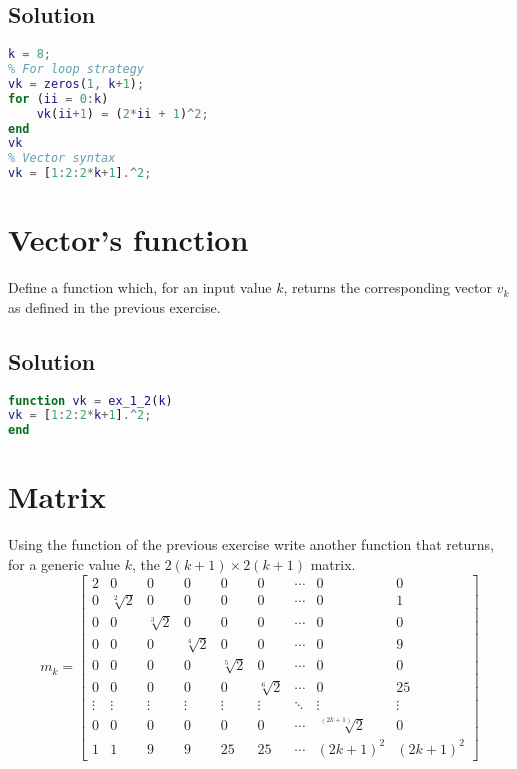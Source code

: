 \documentclass[12pt, a4paper]{report}
\begin{document}
    \subsection*{Solution}
        \begin{lstlisting}[language=Matlab]
k = 8;
% For loop strategy
vk = zeros(1, k+1);
for (ii = 0:k)
    vk(ii+1) = (2*ii + 1)^2;
end
vk
% Vector syntax
vk = [1:2:2*k+1].^2;            
        \end{lstlisting}  

    \newpage

    \section{Vector's function}
        Define a function which, for an input value $k$, returns the corresponding vector $v_k$ as defined in the previous exercise.
    \subsection*{Solution}
        \begin{lstlisting}[language=Matlab]
function vk = ex_1_2(k)
vk = [1:2:2*k+1].^2;
end
        \end{lstlisting}

    \newpage

    \section{Matrix}
        Using the function of the previous exercise write another function that returns, for a generic value $k$, the $2(k + 1) \times 2(k + 1)$ matrix.
        \[
            m_k=
            \begin{bmatrix}
                2 & 0 & 0 & 0 & 0 & 0 & \cdots & 0 & 0 \\
                0 & \sqrt[2]{2} & 0 & 0 & 0 & 0 & \cdots & 0 & 1 \\
                0 & 0 & \sqrt[3]{2} & 0 & 0 & 0 & \cdots & 0 & 0 \\
                0 & 0 & 0 & \sqrt[4]{2} & 0 & 0 & \cdots & 0 & 9 \\
                0 & 0 & 0 & 0 & \sqrt[5]{2} & 0 & \cdots & 0 & 0 \\
                0 & 0 & 0 & 0 & 0 & \sqrt[6]{2} & \cdots & 0 & 25 \\
                \vdots  & \vdots  & \vdots  & \vdots  & \vdots  & \vdots  & \ddots & \vdots  & \vdots  \\
                0 & 0 & 0 & 0 & 0 & 0 & \cdots & \sqrt[(2k+1)]{2} & 0 \\
                1 & 1 & 9 & 9 & 25 & 25 & \cdots & (2k+1)^2 & (2k+1)^2 
            \end{bmatrix} 
        \]
\end{document}

